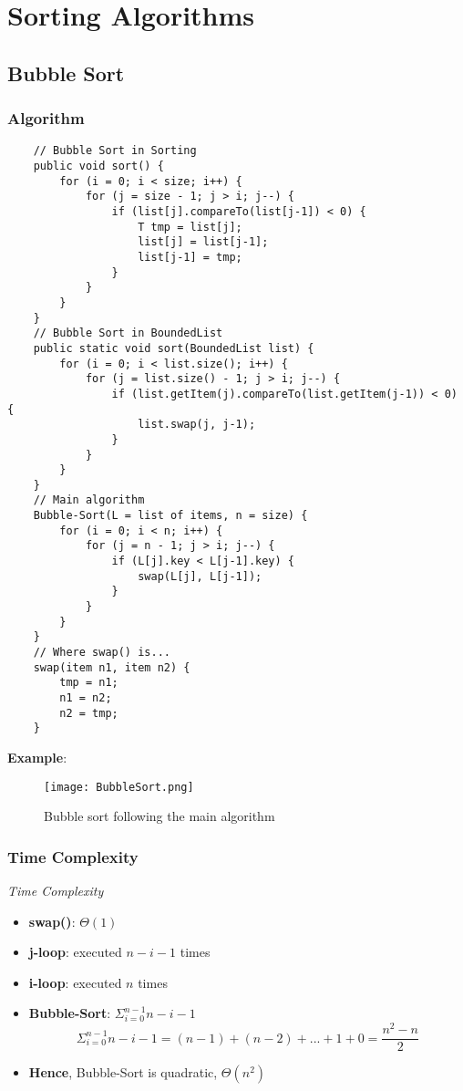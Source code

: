 \documentclass[10pt, 
a4paper, 
oneside, 
headinclude, footinclude, 
BCOR5mm]
{scrartcl}
\begin{document}
\section{Sorting Algorithms}
\subsection{Bubble Sort}
\subsubsection{Algorithm}
\begin{lstlisting}
    // Bubble Sort in Sorting
    public void sort() {
        for (i = 0; i < size; i++) {
            for (j = size - 1; j > i; j--) {
                if (list[j].compareTo(list[j-1]) < 0) {
                    T tmp = list[j];
                    list[j] = list[j-1];
                    list[j-1] = tmp;
                }
            }
        }
    }
    // Bubble Sort in BoundedList
    public static void sort(BoundedList list) {
        for (i = 0; i < list.size(); i++) {
            for (j = list.size() - 1; j > i; j--) {
                if (list.getItem(j).compareTo(list.getItem(j-1)) < 0) {
                    list.swap(j, j-1);
                }
            }
        }
    }
    // Main algorithm
    Bubble-Sort(L = list of items, n = size) {
        for (i = 0; i < n; i++) {
            for (j = n - 1; j > i; j--) {
                if (L[j].key < L[j-1].key) {
                    swap(L[j], L[j-1]);
                }
            }
        }
    }
    // Where swap() is...
    swap(item n1, item n2) {
        tmp = n1;
        n1 = n2;
        n2 = tmp;
    }
\end{lstlisting}
\newpage
\textbf{Example}:
\begin{figure}[H]
    \begin{center}
        \texttt{[image: BubbleSort.png]}
        \caption{Bubble sort following the main algorithm}
    \end{center}
\end{figure}
\subsubsection{Time Complexity}
\begin{definition}
    \textit{Time Complexity}
    \begin{itemize}
        \item \textbf{swap()}: $\Theta(1)$
        \item \textbf{j-loop}: executed $n-i-1$ times
        \item \textbf{i-loop}: executed $n$ times
        \item \textbf{Bubble-Sort}: $\Sigma^{n-1}_{i=0}n-i-1$ $$\Sigma^{n-1}_{i=0}n-i-1=(n-1)+(n-2)+...+1+0=\frac{n^2-n}{2}$$
        \item \textbf{Hence}, Bubble-Sort is quadratic, $\Theta(n^2)$
    \end{itemize}
\end{definition}
\newpage
\end{document}
